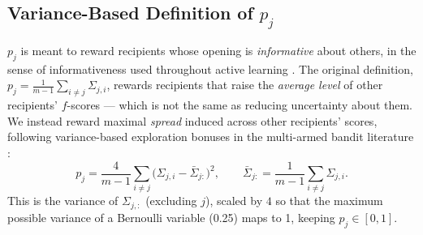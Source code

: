 \subsection{Variance-Based Definition of $p_j$}
\label{sec:variance-p}

$p_j$ is meant to reward recipients whose opening is \emph{informative}
about others, in the sense of informativeness used throughout active
learning \citep{settles2009active}. The original definition,
$p_j = \frac{1}{m-1}\sum_{i\ne j}\Sigma_{j,i}$, rewards recipients that
raise the \emph{average level} of other recipients' $f$-scores --- which is
not the same as reducing uncertainty about them. We instead reward maximal
\emph{spread} induced across other recipients' scores, following
variance-based exploration bonuses in the multi-armed bandit literature
\citep{audibert2009exploration}:
\begin{equation}
\label{eq:p-variance}
p_j = \frac{4}{m-1}\sum_{i\ne j}\big(\Sigma_{j,i} - \bar\Sigma_{j:}\big)^2,
\qquad
\bar\Sigma_{j:} = \frac{1}{m-1}\sum_{i\ne j}\Sigma_{j,i}.
\end{equation}
This is the variance of $\Sigma_{j,:}$ (excluding $j$), scaled by $4$ so
that the maximum possible variance of a Bernoulli variable (0.25) maps to
1, keeping $p_j \in [0,1]$.
